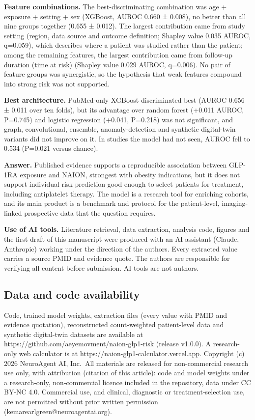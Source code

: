 \documentclass[
  11pt,
]{article}
\begin{document}
\textbf{Feature combinations.} The best-discriminating combination was
age + exposure + setting + sex (XGBoost, AUROC 0.660 ± 0.008), no better
than all nine groups together (0.655 ± 0.012). The largest contribution
came from study setting (region, data source and outcome definition;
Shapley value 0.035 AUROC, q=0.059), which describes where a patient was
studied rather than the patient; among the remaining features, the
largest contribution came from follow-up duration (time at risk)
(Shapley value 0.029 AUROC, q=0.006). No pair of feature groups was
synergistic, so the hypothesis that weak features compound into strong
risk was not supported.

\textbf{Best architecture.} PubMed-only XGBoost discriminated best
(AUROC 0.656 ± 0.011 over ten folds), but its advantage over random
forest (+0.011 AUROC, P=0.745) and logistic regression (+0.041, P=0.218)
was not significant, and graph, convolutional, ensemble,
anomaly-detection and synthetic digital-twin variants did not improve on
it. In studies the model had not seen, AUROC fell to 0.534 (P=0.021
versus chance).

\textbf{Answer.} Published evidence supports a reproducible association
between GLP-1RA exposure and NAION, strongest with obesity indications,
but it does not support individual risk prediction good enough to select
patients for treatment, including antiplatelet therapy. The model is a
research tool for enriching cohorts, and its main product is a benchmark
and protocol for the patient-level, imaging-linked prospective data that
the question requires.

\textbf{Use of AI tools.} Literature retrieval, data extraction,
analysis code, figures and the first draft of this manuscript were
produced with an AI assistant (Claude, Anthropic) working under the
direction of the authors. Every extracted value carries a source PMID
and evidence quote. The authors are responsible for verifying all
content before submission. AI tools are not authors.

\subsection{Data and code
availability}\label{data-and-code-availability}

Code, trained model weights, extraction files (every value with PMID and
evidence quotation), reconstructed count-weighted patient-level data and
synthetic digital-twin datasets are available at
https://github.com/aeyemovment/naion-glp1-risk (release v1.0.0). A
research-only web calculator is at
https://naion-glp1-calculator.vercel.app. Copyright (c) 2026 NeuroAgent
AI, Inc.~All materials are released for non-commercial research use
only, with attribution (citation of this article): code and model
weights under a research-only, non-commercial licence included in the
repository, data under CC BY-NC 4.0. Commercial use, and clinical,
diagnostic or treatment-selection use, are not permitted without prior
written permission (kemarearlgreen@neuroagentai.org).
\end{document}
